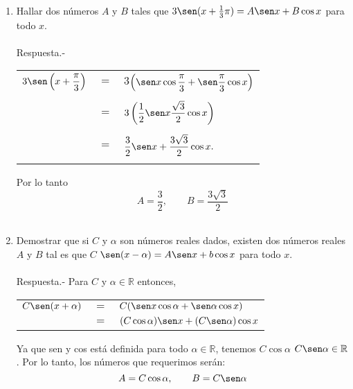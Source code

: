 \begin{enumerate}
\item Hallar dos números $A$ y $B$ tales que $3\sen (x+\frac{1}{3}\pi)=A\sen x + B\cos x$ para todo $x$.\\\\
    Respuesta.-\; 
    \begin{center}
	\begin{tabular}{rcl}
	    $3\sen\left(x+\dfrac{\pi}{3}\right)$&$=$&3$\left(\sen x \cos \dfrac{\pi}{3} + \sen \dfrac{\pi}{3} \cos x\right)$\\\\
	    &$=$&$3\left(\dfrac{1}{2}\sen x \dfrac{\sqrt{3}}{2} \cos x\right)$\\\\
	    &$=$&$\dfrac{3}{2} \sen x + \dfrac{3\sqrt{3}}{2}\cos x.$\\\\
	\end{tabular}
    \end{center}
    Por lo tanto $$A=\dfrac{3}{2}, \qquad B=\dfrac{3\sqrt{3}}{2}$$\\

\item Demostrar que si $C$ y $\alpha$ son números reales dados, existen dos números reales $A$ y $B$ tal es que $C$ $\sen(x-\alpha)=A \sen x + b \cos x $ para todo $x$.\\\\
    Respuesta.-\;  Para $C$ y $\alpha \in \mathbb{R}$ entonces, 
    \begin{center}
	\begin{tabular}{rcl}
	    $C\sen(x+\alpha)$&$=$&$C(\sen x \cos \alpha + \sen \alpha \cos x)$\\
			     &$=$&$(C \cos \alpha)\sen x + (C \sen \alpha)\cos x$\\
	\end{tabular}
    \end{center}
    Ya que sen y cos está definida para todo $\alpha \in \mathbb{R}$, tenemos $C \cos \alpha$ $C\sen \alpha \in \mathbb{R}$. Por lo tanto, los números que requerimos serán: 
    $$A = C \cos \alpha, \qquad B=C\sen \alpha$$\\


\end{enumerate}
